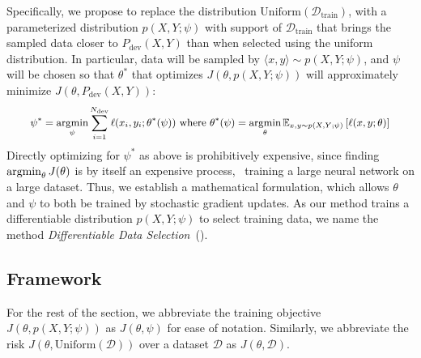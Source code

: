 
Specifically, we propose to replace the distribution $\text{Uniform}(\mathcal{D}_\text{train})$, with a parameterized distribution $p(X, Y; \psi)$ with support of $\mathcal{D}_\text{train}$ that brings the sampled data closer to $P_\text{dev}(X, Y)$ than when selected using the uniform distribution. In particular, data will be sampled by $\langle x, y \rangle \sim p(X, Y; \psi)$, 
and $\psi$ will be chosen so that $\theta^*$ that optimizes $J(\theta, p(X, Y;\psi))$ will approximately minimize $J(\theta, P_\text{dev}(X,Y))$: 
\begin{equation}
  \label{eqn:psi_theta_argmin}
   \small
  \begin{aligned}
    \psi^* = \argmin_\psi
    \sum_{i=1}^{N_\text{dev}} \ell(x_i, y_i; \theta^*(\psi))
    ~\text{where}~
    \theta^*(\psi) = \argmin_\theta \mathbb{E}_{x, y \sim p(X, Y; \psi)} \left[ \ell(x, y; \theta) \right]
  \end{aligned}
\end{equation}
Directly optimizing for $\psi^*$ as above is prohibitively expensive, since finding $\operatorname*{argmin}_\theta J(\theta)$ is by itself an expensive process, \eg~training a large neural network on a large dataset. 
Thus, we establish a mathematical formulation, which allows $\theta$ and $\psi$ to both be trained by stochastic gradient updates. As our method trains a differentiable distribution $p(X, Y; \psi)$ to select training data, we name the method \textit{Differentiable Data Selection}~(\dds).

\subsection{\label{sec:diff_data_selection}Framework}
For the rest of the section, we abbreviate the training objective $J(\theta, p(X, Y;\psi))$ as $J(\theta, \psi)$ for ease of notation. Similarly, we abbreviate the risk $J(\theta, \text{Uniform}(\mathcal{D}))$ over a dataset $\mathcal{D}$ as $J(\theta, \mathcal{D})$.

